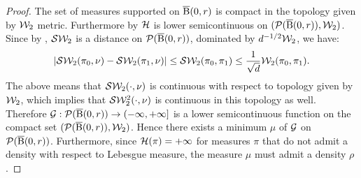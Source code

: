 \begin{proof}
The set of measures supported on $\operatorname{\overline{B}}(0,r)$ is compact in the topology given by ${\cal W}_2$ metric. Furthermore by \cite[Lemma 9.4.3]{ambrosio2008gradient} ${\cal H}$ is lower semicontinuous on $({\cal P}(\operatorname{\overline{B}}(0,r)),{\cal W}_2)$. Since by \cite[Proposition 5.1.2, Proposition 5.1.3]{bonnotte2013unidimensional}, ${\cal S}{\cal W}_2$ is a distance  on ${\cal P}(\operatorname{\overline{B}}(0,r))$, dominated by $d^{-1/2} {\cal W}_2$, we have:
\[
|{\cal S}{\cal W}_2(\pi_0, \nu) - {\cal S}{\cal W}_2(\pi_1, \nu)| \leq {\cal S}{\cal W}_2(\pi_0, \pi_1) \leq \frac{1}{\sqrt{d}}{\cal W}_2(\pi_0, \pi_1).
\]
The above means that ${\cal S}{\cal W}_2(\cdot, \nu)$ is continuous with respect to topology given by ${\cal W}_2$, which implies that ${\cal S}{\cal W}_2^2(\cdot, \nu)$ is continuous in this topology as well. Therefore $\mathcal{G} : {\cal P}(\operatorname{\overline{B}}(0,r)) \to \left(-\infty,+\infty\right]$ is a lower semicontinuous function on the compact set $({\cal P}(\operatorname{\overline{B}}(0,r)),{\cal W}_2)$. Hence there exists a minimum  $\mu$ of $\mathcal{G}$ on $\mathcal{P}(\operatorname{\overline{B}}(0,r))$. Furthermore, since $\mathcal{H}(\pi) = +\infty$  for measures $\pi$ that do not admit a density with respect to Lebesgue measure, the measure $\mu$ must admit a density $\rho$.


\end{proof}
